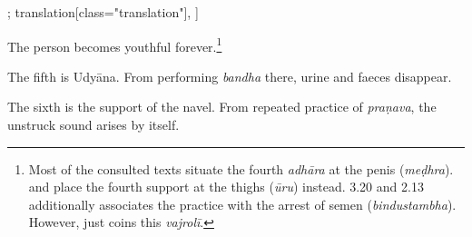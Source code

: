 \begin{alignment}[
  texts=edition[class="edition"];
  translation[class="translation"],
  ]
\begin{translation}
\begin{tlate}
The person becomes youthful forever.\footnote{Most of the consulted texts situate the fourth \textit{adhāra} at the penis (\textit{meḍhra}).  and  place the fourth support at the thighs (\textit{ūru}) instead.  3.20 and  2.13 additionally associates the practice with the arrest of semen (\textit{bindustambha}). However, just  coins this \textit{vajrolī}.}  
      
      The fifth is Udyāna. From performing \textit{bandha} there, urine and faeces disappear.
      
      The sixth is the support of the navel. From repeated practice of \textit{praṇava}, the unstruck sound arises by itself. 
    \end{tlate}
  \end{translation}
\end{alignment}
